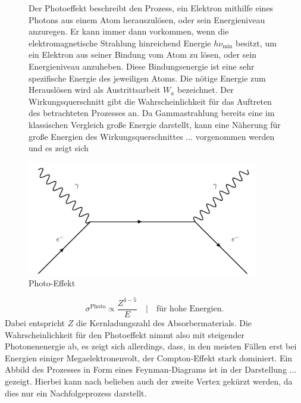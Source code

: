 \begin{figure}
\begin{minipage}{0.5\textwidth}
Der Photoeffekt beschreibt den Prozess, ein Elektron mithilfe eines Photons aus einem Atom herauszulösen, oder sein Energieniveau anzuregen. 
Er kann immer dann vorkommen, wenn die elektromagnetische Strahlung hinreichend Energie $h\nu_{\text{min}}$ besitzt, um ein Elektron aus seiner Bindung vom Atom zu lösen, oder sein Energieniveau anzuheben. 
Diese Bindungsenergie ist eine sehr spezifische Energie des jeweiligen Atoms. Die nötige Energie zum Herauslösen wird als Austrittsarbeit $W_a$ bezeichnet. 
Der Wirkungsquerschnitt gibt die Wahrscheinlichkeit für das Auftreten des betrachteten Prozesses an.
Da Gammastrahlung bereits eine im klassischen Vergleich große Energie darstellt, kann eine Näherung für große Energien des Wirkungsquerschnittes ... vorgenommen werden und es zeigt sich
\end{minipage}
\begin{minipage}{0.5\textwidth}
    \centering
    \includegraphics[width=0.9\textwidth]{bilder/compton.pdf}
    \caption{Photo-Effekt}
\end{minipage}
\end{figure}

\begin{equation*}
\sigma^{\text{Photo}} \propto \frac{Z^{4-5}}{E} \quad | \quad \text{für hohe Energien}.
\end{equation*}
Dabei entspricht $Z$ die Kernladungszahl des Absorbermaterials. 
Die Wahrscheinlichkeit für den Photoeffekt nimmt also mit steigender Photonenenergie ab, es zeigt sich allerdings, dass, in den meisten Fällen erst bei Energien einiger Megaelektronenvolt, der Compton-Effekt stark dominiert. 
Ein Abbild des Prozesses in Form eines Feynman-Diagrams ist in der Darstellung ... gezeigt. Hierbei kann nach belieben auch der zweite Vertex gekürzt werden, da dies nur ein Nachfolgeprozess darstellt.
\newpage

